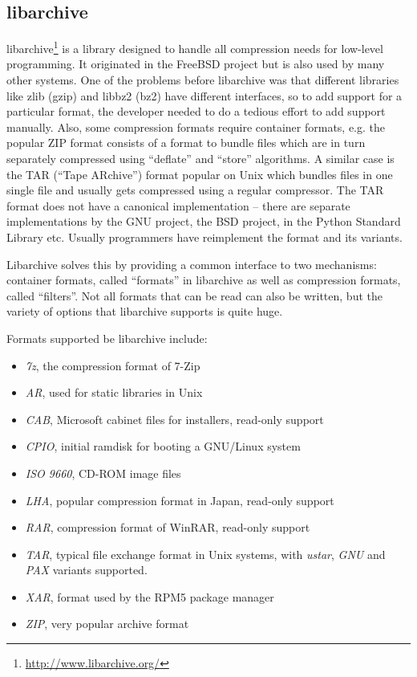 \documentclass[parskip=half]{scrreprt}
\begin{document}
\subsection{libarchive}
\label{sec:libarchive}

libarchive\footnote{\url{http://www.libarchive.org/}} is a library designed to
handle all compression needs for low-level programming. It originated in the
FreeBSD project but is also used by many other systems. One of the problems
before libarchive was that different libraries like zlib (gzip) and libbz2
(bz2) have different interfaces, so to add support for a particular format, the
developer needed to do a tedious effort to add support manually. Also, some
compression formats require container formats, e.g. the popular ZIP format
consists of a format to bundle files which are in turn separately compressed
using \enquote{deflate} and \enquote{store} algorithms. A similar case is the
TAR (\enquote{Tape ARchive}) format popular on Unix which bundles files in one
single file and usually gets compressed using a regular compressor. The TAR
format does not have a canonical implementation -- there are separate
implementations by the GNU project, the BSD project, in the Python Standard
Library etc. Usually programmers have reimplement the format and its variants.

Libarchive solves this by providing a common interface to two mechanisms:
container formats, called \enquote{formats} in libarchive as well as
compression formats, called \enquote{filters}. Not all formats that can be read
can also be written, but the variety of options that libarchive supports is
quite huge.

Formats supported be libarchive include:

\begin{itemize}
  \item \emph{7z}, the compression format of 7-Zip
  \item \emph{AR}, used for static libraries in Unix
  \item \emph{CAB}, Microsoft cabinet files for installers, read-only support
  \item \emph{CPIO}, initial ramdisk for booting a GNU/Linux system
  \item \emph{ISO 9660}, CD-ROM image files
  \item \emph{LHA}, popular compression format in Japan, read-only support
  \item \emph{RAR}, compression format of WinRAR, read-only support
  \item \emph{TAR}, typical file exchange format in Unix systems, with
    \emph{ustar}, \emph{GNU} and \emph{PAX} variants supported.
  \item \emph{XAR}, format used by the RPM5 package manager
  \item \emph{ZIP}, very popular archive format
\end{itemize}
\end{document}
